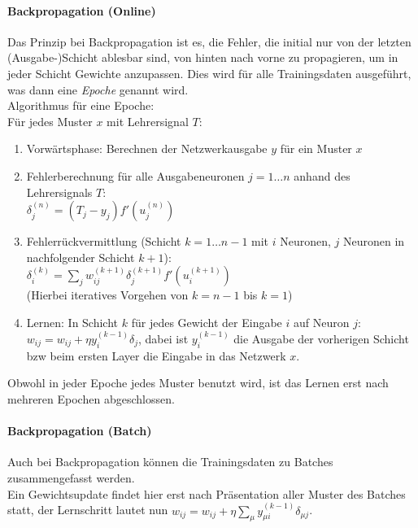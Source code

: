 \paragraph{Backpropagation (Online)}
Das Prinzip bei Backpropagation ist es, die Fehler, die initial nur von der letzten (Ausgabe-)Schicht ablesbar sind, von hinten nach vorne zu propagieren, um in jeder Schicht Gewichte anzupassen. Dies wird für alle Trainingsdaten ausgeführt, was dann eine \emph{Epoche} genannt wird.\\
Algorithmus für eine Epoche:\\
Für jedes Muster $x$ mit Lehrersignal $T$:
\begin{enumerate}
    \item Vorwärtsphase: Berechnen der Netzwerkausgabe $y$ für ein Muster $x$
    \item Fehlerberechnung für alle Ausgabeneuronen $j=1\dots n$ anhand des Lehrersignals $T$:\\
        $\delta_j^{(n)} = (T_j - y_j)f'(u_j^{(n)})$
    \item Fehlerrückvermittlung (Schicht $k = 1\dots n-1$ mit $i$ Neuronen, $j$ Neuronen in nachfolgender Schicht $k+1$):\\
        $\delta_i^{(k)} = \sum_j w_{ij}^{(k+1)} \delta_j^{(k+1)} f'(u_i^{(k+1)})$\\
        (Hierbei iteratives Vorgehen von $k=n-1$ bis $k=1$)
    \item Lernen: In Schicht $k$ für jedes Gewicht der Eingabe $i$ auf Neuron $j$: $w_{ij} = w_{ij} + \eta y_i^{(k-1)} \delta_j$,
        dabei ist $y_i^{(k-1)}$ die Ausgabe der vorherigen Schicht bzw beim ersten Layer die Eingabe in das Netzwerk $x$.
\end{enumerate}
Obwohl in jeder Epoche jedes Muster benutzt wird, ist das Lernen erst nach mehreren Epochen abgeschlossen.

\paragraph{Backpropagation (Batch)}
Auch bei Backpropagation können die Trainingsdaten zu Batches zusammengefasst werden.\\
Ein Gewichtsupdate findet hier erst nach Präsentation aller Muster des Batches statt, der Lernschritt
lautet nun $w_{ij} = w_{ij} + \eta \sum_\mu y_{\mu i}^{(k-1)} \delta_{\mu j}$.






